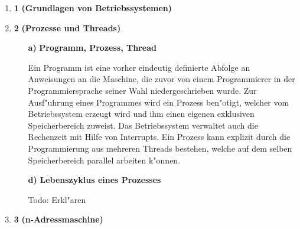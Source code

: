 \documentclass[a4paper,11pt]{article}
\author{\authorinfo}
\title{\titleinfo}
\date{\today}
\begin{document}
\maketitle


\begin {enumerate}
\item[\textbf{1}]
    \textbf{(Grundlagen von Betriebssystemen)}

\item[\textbf{2}]
    \textbf{(Prozesse und Threads)}

    \begin{enumerate}
        \item[\textbf{a)}]
            \textbf{Programm, Prozess, Thread}

            Ein Programm ist eine vorher eindeutig definierte Abfolge an Anweisungen an die Maschine,
            die zuvor von einem Programmierer in der Programmiersprache seiner Wahl niedergeschrieben wurde. Zur Ausf"uhrung eines Programmes wird ein Prozess ben"otigt, welcher vom Betriebssystem erzeugt wird und ihm einen eigenen exklusiven Speicherbereich zuweist.
            Das Betriebssystem verwaltet auch die Rechenzeit mit Hilfe von Interrupts. 
            Ein Prozess kann explizit durch die Programmierung aus mehreren Threads bestehen, welche auf dem selben Speicherbereich parallel arbeiten k"onnen.

        \item[\textbf{d)}]
            \textbf{Lebenszyklus eines Prozesses}


            Todo: Erkl"aren


    \end{enumerate}


\item[\textbf{3}]
    \textbf{(n-Adressmaschine)}

\end{enumerate}
\end{document}
